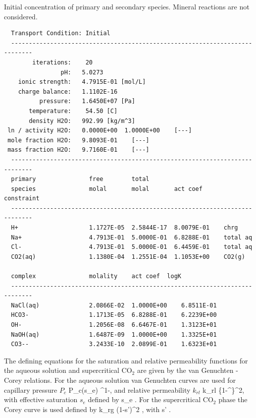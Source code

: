 \begin{table}[h]
\caption{Initial concentration of primary and secondary species. Mineral reactions are not considered.}
\label{tinitial_co2}
\scriptsize
\begin{verbatim}
  Transport Condition: Initial
  ----------------------------------------------------------------------------
        iterations:    20
                pH:   5.0273
    ionic strength:   4.7915E-01 [mol/L]
    charge balance:   1.1102E-16
          pressure:   1.6450E+07 [Pa]
       temperature:    54.50 [C]
       density H2O:   992.99 [kg/m^3]
 ln / activity H2O:   0.0000E+00  1.0000E+00    [---]
 mole fraction H2O:   9.8093E-01    [---]
 mass fraction H2O:   9.7160E-01    [---]
  ----------------------------------------------------------------------------
  primary               free        total
  species               molal       molal       act coef     constraint
  ----------------------------------------------------------------------------
  H+                    1.1727E-05  2.5844E-17  8.0079E-01    chrg
  Na+                   4.7913E-01  5.0000E-01  6.8288E-01    total aq
  Cl-                   4.7913E-01  5.0000E-01  6.4459E-01    total aq
  CO2(aq)               1.1380E-04  1.2551E-04  1.1053E+00    CO2(g)

  complex               molality    act coef  logK
  ----------------------------------------------------------------------------
  NaCl(aq)              2.0866E-02  1.0000E+00    6.8511E-01
  HCO3-                 1.1713E-05  6.8288E-01    6.2239E+00
  OH-                   1.2056E-08  6.6467E-01    1.3123E+01
  NaOH(aq)              1.6487E-09  1.0000E+00    1.3325E+01
  CO3--                 3.2433E-10  2.0899E-01    1.6323E+01
\end{verbatim}
\end{table}

\normalsize

The defining equations for the saturation and relative permeability functions for the aqueous solution and supercritical CO$_2$ are given by the van Genuchten -Corey relations. For the aqueous solution van Genuchten curves are used for capillary pressure $P_c$
\EQ\label{pc}
P_c(s_e) \eq {}^{1-\lambda},
\EN
and relative permeability $k_{rl}$
\EQ
k_{rl} \eq {}\left\{1-^\lambda\right\}^2,
\EN
with effective saturation $s_e$ defined by
\EQ
s_e \eq {}.
\EN
For the supercritical CO$_2$ phase the Corey curve is used defined by
\EQ
k_{rg} \eq \big(1-s'\big)^2 \big[1-(s')^2\big],
\EN
with
\EQ\label{sg}
s' \eq {}.
\EN

